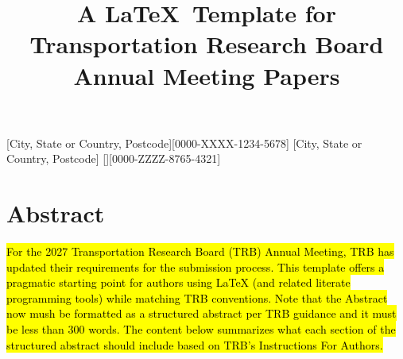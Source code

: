 \documentclass[numbered]{trbunofficial}
\begin{document}

\title{A \LaTeX\ Template for Transportation Research Board Annual Meeting Papers}

[City, State or Country, Postcode][0000-XXXX-1234-5678]
[City, State or Country, Postcode]
[][0000-ZZZZ-8765-4321]



\maketitle

\section{Abstract}
\hl{For the 2027 Transportation Research Board (TRB) Annual Meeting, TRB has updated their requirements for the submission process. This template offers a pragmatic starting point for authors using LaTeX (and related literate programming tools) while matching TRB conventions. Note that the Abstract now mush be formatted as a structured abstract per TRB guidance and it must be less than 300 words. The content below summarizes what each section of the structured abstract should include based on TRB's Instructions For Authors.}
\end{document}
